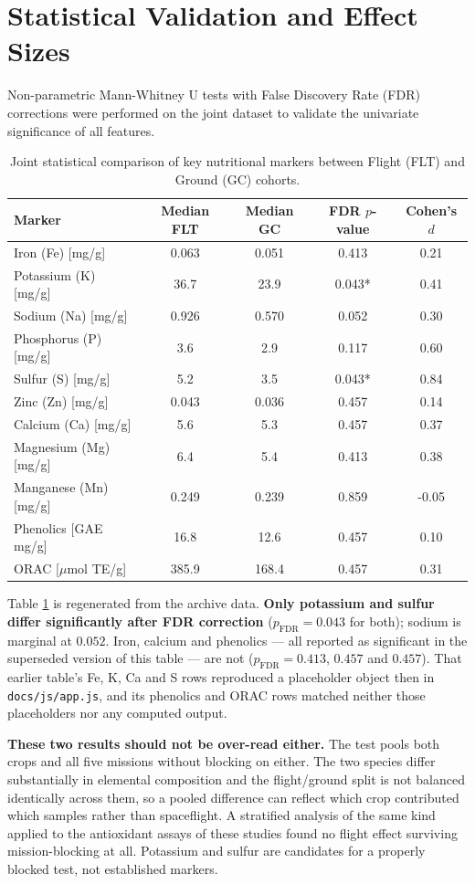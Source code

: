 \section{Statistical Validation and Effect Sizes}
Non-parametric Mann-Whitney U tests with False Discovery Rate (FDR) corrections were performed on the joint dataset to validate the univariate significance of all features.

\begin{table}[htpb]
    \centering
    \caption{Joint statistical comparison of key nutritional markers between Flight (FLT) and Ground (GC) cohorts.}
    \label{tab:meta_stats}
    \begin{tabular}{@{}lcccc@{}}
        \toprule
        \textbf{Marker} & \textbf{Median FLT} & \textbf{Median GC} & \textbf{FDR $p$-value} & \textbf{Cohen's $d$} \\ \midrule
        Iron (Fe) [mg/g] & 0.063 & 0.051 & 0.413 & 0.21 \\
        Potassium (K) [mg/g] & 36.7 & 23.9 & 0.043* & 0.41 \\
        Sodium (Na) [mg/g] & 0.926 & 0.570 & 0.052 & 0.30 \\
        Phosphorus (P) [mg/g] & 3.6 & 2.9 & 0.117 & 0.60 \\
        Sulfur (S) [mg/g] & 5.2 & 3.5 & 0.043* & 0.84 \\
        Zinc (Zn) [mg/g] & 0.043 & 0.036 & 0.457 & 0.14 \\
        Calcium (Ca) [mg/g] & 5.6 & 5.3 & 0.457 & 0.37 \\
        Magnesium (Mg) [mg/g] & 6.4 & 5.4 & 0.413 & 0.38 \\
        Manganese (Mn) [mg/g] & 0.249 & 0.239 & 0.859 & -0.05 \\
        Phenolics [GAE mg/g] & 16.8 & 12.6 & 0.457 & 0.10 \\
        ORAC [$\mu$mol TE/g] & 385.9 & 168.4 & 0.457 & 0.31 \\ \bottomrule
    \end{tabular}
\end{table}

Table \ref{tab:meta_stats} is regenerated from the archive data.
\textbf{Only potassium and sulfur differ significantly after FDR correction}
($p_{\text{FDR}} = 0.043$ for both); sodium is marginal at $0.052$. Iron,
calcium and phenolics --- all reported as significant in the superseded version
of this table --- are not ($p_{\text{FDR}} = 0.413$, $0.457$ and $0.457$). That
earlier table's Fe, K, Ca and S rows reproduced a placeholder object then in
\texttt{docs/js/app.js}, and its phenolics and ORAC rows matched neither those
placeholders nor any computed output.

\textbf{These two results should not be over-read either.} The test pools both
crops and all five missions without blocking on either. The two species differ
substantially in elemental composition and the flight/ground split is not
balanced identically across them, so a pooled difference can reflect which crop
contributed which samples rather than spaceflight. A stratified analysis of the
same kind applied to the antioxidant assays of these studies found no flight
effect surviving mission-blocking at all. Potassium and sulfur are candidates
for a properly blocked test, not established markers.
